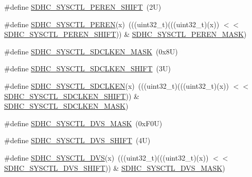 \begin{DoxyCompactItemize}
\#define \mbox{\hyperlink{group___s_d_h_c___register___masks_ga28db53e7da45cb7a0ed9de6c7bac7a85}{S\+D\+H\+C\+\_\+\+S\+Y\+S\+C\+T\+L\+\_\+\+P\+E\+R\+E\+N\+\_\+\+S\+H\+I\+FT}}~(2\+U)
\item 
\#define \mbox{\hyperlink{group___s_d_h_c___register___masks_ga5620ba5f038f7954503c184b90bb639a}{S\+D\+H\+C\+\_\+\+S\+Y\+S\+C\+T\+L\+\_\+\+P\+E\+R\+EN}}(x)~(((uint32\+\_\+t)(((uint32\+\_\+t)(x)) $<$$<$ \mbox{\hyperlink{group___s_d_h_c___register___masks_ga28db53e7da45cb7a0ed9de6c7bac7a85}{S\+D\+H\+C\+\_\+\+S\+Y\+S\+C\+T\+L\+\_\+\+P\+E\+R\+E\+N\+\_\+\+S\+H\+I\+FT}})) \& \mbox{\hyperlink{group___s_d_h_c___register___masks_ga23b3d2c76db562da51b824fa435f306c}{S\+D\+H\+C\+\_\+\+S\+Y\+S\+C\+T\+L\+\_\+\+P\+E\+R\+E\+N\+\_\+\+M\+A\+SK}})
\item 
\#define \mbox{\hyperlink{group___s_d_h_c___register___masks_ga19de408b244a32169fec30115c0b8a4a}{S\+D\+H\+C\+\_\+\+S\+Y\+S\+C\+T\+L\+\_\+\+S\+D\+C\+L\+K\+E\+N\+\_\+\+M\+A\+SK}}~(0x8\+U)
\item 
\#define \mbox{\hyperlink{group___s_d_h_c___register___masks_ga4dbc0c5f5a10fdd6b7fb6642f10548df}{S\+D\+H\+C\+\_\+\+S\+Y\+S\+C\+T\+L\+\_\+\+S\+D\+C\+L\+K\+E\+N\+\_\+\+S\+H\+I\+FT}}~(3\+U)
\item 
\#define \mbox{\hyperlink{group___s_d_h_c___register___masks_gad5cc56a7b561074941b8959847f9850c}{S\+D\+H\+C\+\_\+\+S\+Y\+S\+C\+T\+L\+\_\+\+S\+D\+C\+L\+K\+EN}}(x)~(((uint32\+\_\+t)(((uint32\+\_\+t)(x)) $<$$<$ \mbox{\hyperlink{group___s_d_h_c___register___masks_ga4dbc0c5f5a10fdd6b7fb6642f10548df}{S\+D\+H\+C\+\_\+\+S\+Y\+S\+C\+T\+L\+\_\+\+S\+D\+C\+L\+K\+E\+N\+\_\+\+S\+H\+I\+FT}})) \& \mbox{\hyperlink{group___s_d_h_c___register___masks_ga19de408b244a32169fec30115c0b8a4a}{S\+D\+H\+C\+\_\+\+S\+Y\+S\+C\+T\+L\+\_\+\+S\+D\+C\+L\+K\+E\+N\+\_\+\+M\+A\+SK}})
\item 
\#define \mbox{\hyperlink{group___s_d_h_c___register___masks_ga8311f017ab13388163976f2e422d072d}{S\+D\+H\+C\+\_\+\+S\+Y\+S\+C\+T\+L\+\_\+\+D\+V\+S\+\_\+\+M\+A\+SK}}~(0x\+F0\+U)
\item 
\#define \mbox{\hyperlink{group___s_d_h_c___register___masks_gafc17e8d8673044839bfc65d01ea0bc0b}{S\+D\+H\+C\+\_\+\+S\+Y\+S\+C\+T\+L\+\_\+\+D\+V\+S\+\_\+\+S\+H\+I\+FT}}~(4\+U)
\item 
\#define \mbox{\hyperlink{group___s_d_h_c___register___masks_gaa00d0f672befe002bdc5ab4c68fdf2a5}{S\+D\+H\+C\+\_\+\+S\+Y\+S\+C\+T\+L\+\_\+\+D\+VS}}(x)~(((uint32\+\_\+t)(((uint32\+\_\+t)(x)) $<$$<$ \mbox{\hyperlink{group___s_d_h_c___register___masks_gafc17e8d8673044839bfc65d01ea0bc0b}{S\+D\+H\+C\+\_\+\+S\+Y\+S\+C\+T\+L\+\_\+\+D\+V\+S\+\_\+\+S\+H\+I\+FT}})) \& \mbox{\hyperlink{group___s_d_h_c___register___masks_ga8311f017ab13388163976f2e422d072d}{S\+D\+H\+C\+\_\+\+S\+Y\+S\+C\+T\+L\+\_\+\+D\+V\+S\+\_\+\+M\+A\+SK}})
$$
\end{DoxyCompactItemize}
